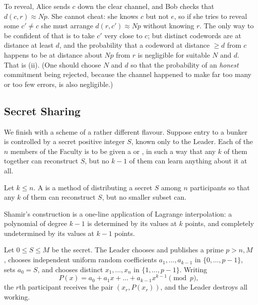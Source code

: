 \documentclass[a4paper]{scrartcl}
\begin{document}
To reveal, Alice sends $c$ down the clear channel, and Bob checks that $d(c,r)\approx Np$. She cannot cheat: she knows $c$ but not $e$, so if she tries to reveal some $c'\ne c$ she must arrange $d(r,c')\approx Np$ without knowing $r$. The only way to be confident of that is to take $c'$ very close to $c$; but distinct codewords are at distance at least $d$, and the probability that a codeword at distance $\ge d$ from $c$ happens to be at distance about $Np$ from $r$ is negligible for suitable $N$ and $d$. That is (ii). (One should choose $N$ and $d$ so that the probability of an \emph{honest} commitment being rejected, because the channel happened to make far too many or too few errors, is also negligible.)

\subsection{Secret Sharing}

We finish with a scheme of a rather different flavour. Suppose entry to a bunker is controlled by a secret positive integer $S$, known only to the Leader. Each of the $n$ members of the Faculty is to be given a  or , in such a way that any $k$ of them together can reconstruct $S$, but no $k-1$ of them can learn anything about it at all.

\begin{definition}
	Let $k \le n$. A  is a method of distributing a secret $S$ among $n$ participants so that any $k$ of them can reconstruct $S$, but no smaller subset can.
\end{definition}

Shamir's construction is a one-line application of Lagrange interpolation: a polynomial of degree $k-1$ is determined by its values at $k$ points, and completely undetermined by its values at $k-1$ points.

Let $0 \le S \le M$ be the secret. The Leader chooses and publishes a prime $p > n, M$, chooses independent uniform random coefficients $a_1,\dots,a_{k-1}$ in $\{0,\dots,p-1\}$, sets $a_0 = S$, and chooses distinct $x_1,\dots,x_n$ in $\{1,\dots,p-1\}$. Writing
$$P(x) = a_0+a_1x+\dots+a_{k-1}x^{k-1} \pmod p,$$
the $r$th participant receives the pair $(x_r, P(x_r))$, and the Leader destroys all working.
\end{document}
